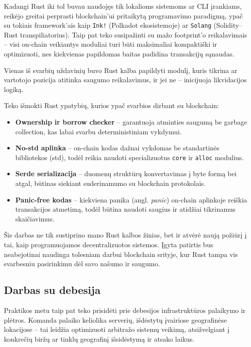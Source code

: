 \documentclass[]{VUMIFTemplateClass}
\begin{document}
Kadangi Rust iki tol buvau naudojęs tik lokalioms sistemoms ar CLI įrankiams, reikėjo greitai perprasti blockchain’ui pritaikytą programavimo paradigmą, ypač su tokiais framework’ais kaip \texttt{Ink!} (Polkadot ekosistemoje) ar \texttt{Solang} (Solidity–Rust transpiliatorius). Taip pat teko susipažinti su mažo footprint’o reikalavimais – visi on-chain veikiantys moduliai turi būti maksimaliai kompaktiški ir optimizuoti, nes kiekvienas papildomas baitas padidina transakcijų sąnaudas.

Vienas iš svarbių uždavinių buvo Rust kalba papildyti modulį, kuris tikrina ar vartotojo pozicija atitinka saugumo reikalavimus, ir jei ne – inicijuoja likvidacijos logiką.

Teko išmokti Rust ypatybių, kurios ypač svarbios dirbant su blockchain:

\begin{itemize}
  \item \textbf{Ownership ir borrow checker} – garantuoja atminties saugumą be garbage collection, kas labai svarbu deterministiniam vykdymui.
  \item \textbf{No-std aplinka} – on-chain kodas dažnai vykdomas be standartinės bibliotekos (std), todėl reikia naudoti specializuotus \texttt{core} ir \texttt{alloc} modulius.
  \item \textbf{Serde serializacija} – duomenų struktūrų konvertavimas į byte formą bei atgal, būtinas siekiant suderinamumo su blockchain protokolais.
  \item \textbf{Panic-free kodas} – kiekviena panika (angl. \textit{panic}) on-chain aplinkoje reiškia transakcijos atmetimą, todėl būtina naudoti saugius ir atidžiai tikrinamus skaičiavimus.
\end{itemize}

Šis darbas ne tik sustiprino mano Rust kalbos žinias, bet ir atvėrė naują požiūrį į tai, kaip programuojamos decentralizuotos sistemos. Įgyta patirtis bus neabejotinai naudinga tolesniam darbui blockchain srityje, kur Rust tampa vis svarbesniu pasirinkimu dėl savo našumo ir saugumo.

\subsection{Darbas su debesija}
Praktikos metu taip pat teko prisidėti prie debesijos infrastruktūros palaikymo ir plėtros. Komanda palaiko keliolika serverių, išdėstytų įvairiose geografinėse lokacijose – tai leidžia optimizuoti arbitražo sistemų veikimą, atsižvelgiant į konkrečių biržų ar tinklų geografinį išsidėstymą ir atsako laikus.
\end{document}
